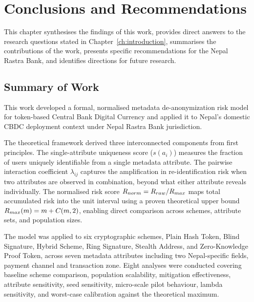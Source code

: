 \chapter{Conclusions and Recommendations}
\label{ch:conclusions}

This chapter synthesises the findings of this work, provides
direct answers to the research questions stated in
Chapter~\ref{ch:introduction}, summarises the contributions of
the work, presents specific recommendations for the Nepal Rastra
Bank, and identifies directions for future research.

\section{Summary of Work}
\label{sec:summary}

This work developed a formal, normalised metadata
de-anonymization risk model for token-based Central Bank Digital
Currency and applied it to Nepal's domestic CBDC deployment
context under Nepal Rastra Bank jurisdiction.

The theoretical framework derived three interconnected components
from first principles. The single-attribute uniqueness score ($s(a_i)$) measures the fraction of users uniquely identifiable
from a single metadata attribute. The pairwise interaction
coefficient $\lambda_{ij}$ captures the amplification in
re-identification risk when two attributes are observed in
combination, beyond what either attribute reveals individually.
The normalised risk score $R_{norm} = R_{raw} / R_{max}$
maps total accumulated risk into the unit interval using a proven
theoretical upper bound $R_{max}(m) = m + C(m,2)$, enabling
direct comparison across schemes, attribute sets, and population
sizes.

The model was applied to six cryptographic schemes, Plain Hash
Token, Blind Signature, Hybrid Scheme, Ring Signature, Stealth
Address, and Zero-Knowledge Proof Token, across seven metadata attributes
including two Nepal-specific fields, payment channel and
transaction zone. Eight analyses were conducted covering baseline
scheme comparison, population scalability, mitigation
effectiveness, attribute sensitivity, seed sensitivity,
micro-scale pilot behaviour, lambda sensitivity, and worst-case
calibration against the theoretical maximum.


